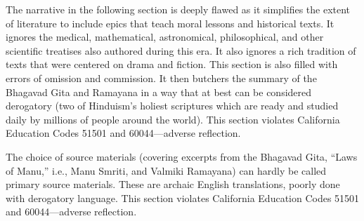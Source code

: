 The narrative in the following section is deeply flawed as it simplifies the extent of literature to include epics that teach moral lessons and historical texts. It ignores the medical, mathematical, astronomical, philosophical, and other scientific treatises also authored during this era. It also ignores a rich tradition of texts that were centered on drama and fiction. This section is also filled with errors of omission and commission. It then butchers the summary of the Bhagavad Gita and Ramayana in a way that at best can be considered derogatory (two of Hinduism’s holiest scriptures which are ready and studied daily by millions of people around the world). This section violates California Education Codes 51501 and 60044—adverse reflection.

The choice of source materials (covering excerpts from the Bhagavad Gita, “Laws of Manu,” i.e., Manu Smriti, and Valmiki Ramayana) can hardly be called primary source materials. These are archaic English translations, poorly done with derogatory language. This section violates California Education Codes 51501 and 60044—adverse reflection.

